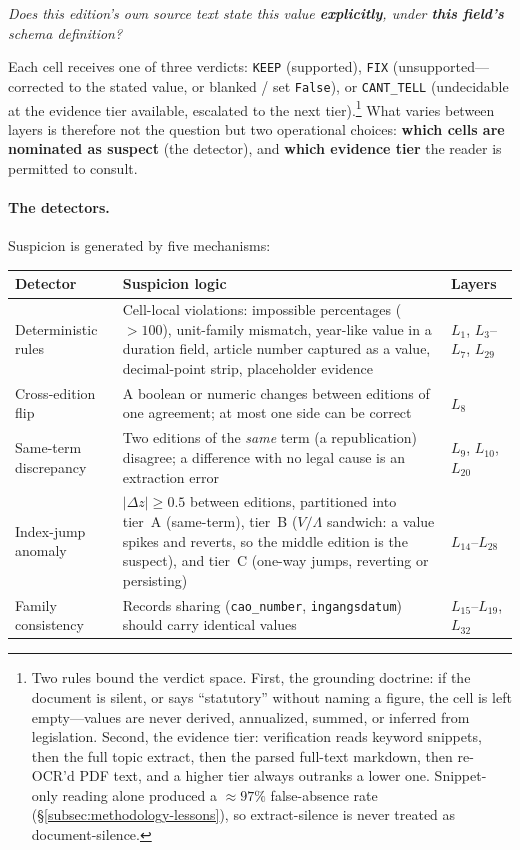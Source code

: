 \begin{center}
\emph{Does this edition's own source text state this value \textbf{explicitly}, under \textbf{this field's} schema definition?}
\end{center}

Each cell receives one of three verdicts: \texttt{KEEP} (supported), \texttt{FIX} (unsupported---corrected to the stated value, or blanked / set \texttt{False}), or \texttt{CANT\_TELL} (undecidable at the evidence tier available, escalated to the next tier).\footnote{Two rules bound the verdict space. First, the grounding doctrine: if the document is silent, or says ``statutory'' without naming a figure, the cell is left empty---values are never derived, annualized, summed, or inferred from legislation. Second, the evidence tier: verification reads keyword snippets, then the full topic extract, then the parsed full-text markdown, then re-OCR'd PDF text, and a higher tier always outranks a lower one. Snippet-only reading alone produced a $\approx 97\%$ false-absence rate (\S\ref{subsec:methodology-lessons}), so extract-silence is never treated as document-silence.} What varies between layers is therefore not the question but two operational choices: \textbf{which cells are nominated as suspect} (the detector), and \textbf{which evidence tier} the reader is permitted to consult.

\paragraph{The detectors.} Suspicion is generated by five mechanisms:

\begin{center}
\begin{tabularx}{\textwidth}{@{}p{3.1cm}Xp{2.3cm}@{}}
\toprule
\textbf{Detector} & \textbf{Suspicion logic} & \textbf{Layers} \\
\midrule
Deterministic rules & Cell-local violations: impossible percentages ($>100$), unit-family mismatch, year-like value in a duration field, article number captured as a value, decimal-point strip, placeholder evidence & $L_1$, $L_3$--$L_7$, $L_{29}$ \\
Cross-edition flip & A boolean or numeric changes between editions of one agreement; at most one side can be correct & $L_8$ \\
Same-term discrepancy & Two editions of the \emph{same} term (a republication) disagree; a difference with no legal cause is an extraction error & $L_9$, $L_{10}$, $L_{20}$ \\
Index-jump anomaly & $|\Delta z| \ge 0.5$ between editions, partitioned into tier~A (same-term), tier~B ($V/\Lambda$ sandwich: a value spikes and reverts, so the middle edition is the suspect), and tier~C (one-way jumps, reverting or persisting) & $L_{14}$--$L_{28}$ \\
Family consistency & Records sharing (\texttt{cao\_number}, \texttt{ingangsdatum}) should carry identical values & $L_{15}$--$L_{19}$, $L_{32}$ \\
\bottomrule
\end{tabularx}
\end{center}

